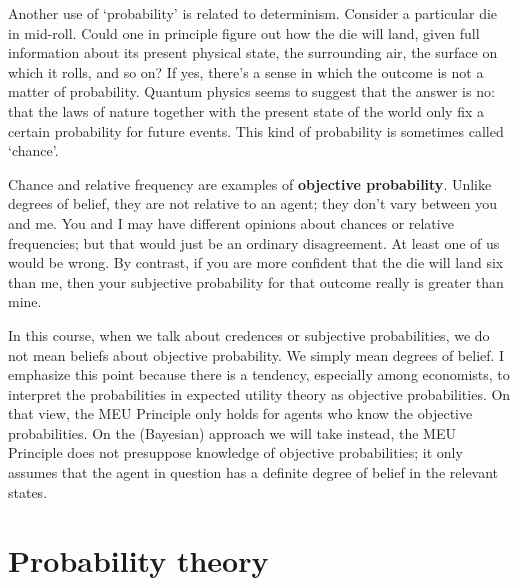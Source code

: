 Another use of `probability' is related to determinism. Consider a
particular die in mid-roll. Could one in principle figure out how the
die will land, given full information about its present physical
state, the surrounding air, the surface on which it rolls, and so on?
If yes, there's a sense in which the outcome is not a matter of
probability. Quantum physics seems to suggest that the answer is no:
that the laws of nature together with the present state of the world
only fix a certain probability for future events. This kind of
probability is sometimes called `chance'.

Chance and relative frequency are examples of \textbf{objective
  probability}. Unlike degrees of belief, they are not relative to an
agent; they don't vary between you and me. You and I may have
different opinions about chances or relative frequencies; but that
would just be an ordinary disagreement. At least one of us would be
wrong. By contrast, if you are more confident that the die will land
six than me, then your subjective probability for that outcome really
is greater than mine.

In this course, when we talk about credences or subjective
probabilities, we do not mean beliefs about objective probability. We
simply mean degrees of belief.
%
%
I emphasize this point because there is a tendency, especially among
economists, to interpret the probabilities in expected utility theory
as objective probabilities. On that view, the MEU Principle only holds
for agents who know the objective probabilities. On the (Bayesian)
approach we will take instead, the MEU Principle does not presuppose
knowledge of objective probabilities; it only assumes that the agent
in question has a definite degree of belief in the relevant states.


\section{Probability theory}

